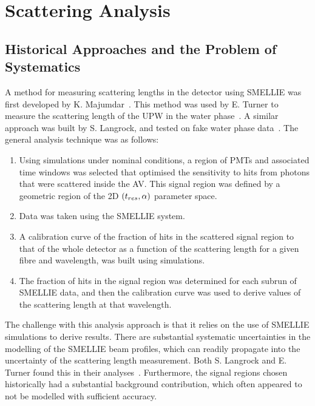 \section{Scattering Analysis}\label{sec:scattering_analysis}
\subsection{Historical Approaches and the Problem of Systematics}
A method for measuring scattering lengths in the detector using SMELLIE was first developed by K. Majumdar~\cite{majumdarMeasurementOpticalScattering2015}. This method was used by E. Turner to measure the scattering length of the UPW in the water phase~\cite{turnerMeasurementScatteringCharacteristics2022}. A similar approach was built by S. Langrock, and tested on fake water phase data~\cite{langrockMeasurementRayleighScattering2016}. The general analysis technique was as follows:
\begin{enumerate}
    \item Using simulations under nominal conditions, a region of PMTs and associated time windows was selected that optimised the sensitivity to hits from photons that were scattered inside the AV. This signal region was defined by a geometric region of the 2D $(t_{res}{},\alpha)$ parameter space.
    \item Data was taken using the SMELLIE system.
    \item A calibration curve of the fraction of hits in the scattered signal region to that of the whole detector as a function of the scattering length for a given fibre and wavelength, was built using simulations.
    \item The fraction of hits in the signal region was determined for each subrun of SMELLIE data, and then the calibration curve was used to derive values of the scattering length at that wavelength.
\end{enumerate}

The challenge with this analysis approach is that it relies on the use of SMELLIE simulations to derive results. There are substantial systematic uncertainties in the modelling of the SMELLIE beam profiles, which can readily propagate into the uncertainty of the scattering length measurement. Both S. Langrock and E. Turner found this in their analyses~\cite{langrockMeasurementRayleighScattering2016,turnerMeasurementScatteringCharacteristics2022}. Furthermore, the signal regions chosen historically had a substantial background contribution, which often appeared to not be modelled with sufficient accuracy.


